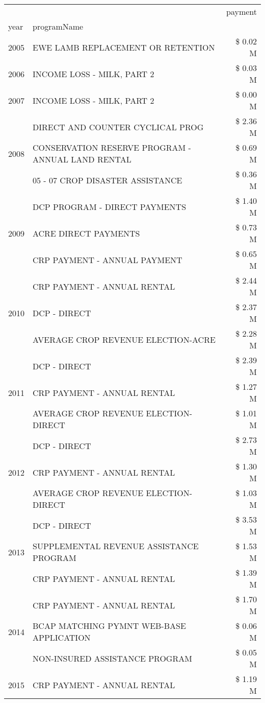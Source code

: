 \begin{tabular}{llr}
\toprule
 &  & payment \\
year & programName &  \\
\midrule
2005 & EWE LAMB REPLACEMENT OR RETENTION & \$ 0.02 M \\
\cline{1-3}
2006 & INCOME LOSS - MILK, PART 2 & \$ 0.03 M \\
\cline{1-3}
2007 & INCOME LOSS - MILK, PART 2 & \$ 0.00 M \\
\cline{1-3}
\multirow[t]{3}{*}{2008} & DIRECT AND COUNTER CYCLICAL PROG & \$ 2.36 M \\
 & CONSERVATION RESERVE PROGRAM - ANNUAL LAND RENTAL & \$ 0.69 M \\
 & 05 - 07 CROP DISASTER ASSISTANCE & \$ 0.36 M \\
\cline{1-3}
\multirow[t]{3}{*}{2009} & DCP PROGRAM - DIRECT PAYMENTS & \$ 1.40 M \\
 & ACRE DIRECT PAYMENTS & \$ 0.73 M \\
 & CRP PAYMENT - ANNUAL PAYMENT & \$ 0.65 M \\
\cline{1-3}
\multirow[t]{3}{*}{2010} & CRP PAYMENT - ANNUAL RENTAL & \$ 2.44 M \\
 & DCP - DIRECT & \$ 2.37 M \\
 & AVERAGE CROP REVENUE ELECTION-ACRE & \$ 2.28 M \\
\cline{1-3}
\multirow[t]{3}{*}{2011} & DCP - DIRECT & \$ 2.39 M \\
 & CRP PAYMENT - ANNUAL RENTAL & \$ 1.27 M \\
 & AVERAGE CROP REVENUE ELECTION-DIRECT & \$ 1.01 M \\
\cline{1-3}
\multirow[t]{3}{*}{2012} & DCP - DIRECT & \$ 2.73 M \\
 & CRP PAYMENT - ANNUAL RENTAL & \$ 1.30 M \\
 & AVERAGE CROP REVENUE ELECTION-DIRECT & \$ 1.03 M \\
\cline{1-3}
\multirow[t]{3}{*}{2013} & DCP - DIRECT & \$ 3.53 M \\
 & SUPPLEMENTAL REVENUE ASSISTANCE PROGRAM & \$ 1.53 M \\
 & CRP PAYMENT - ANNUAL RENTAL & \$ 1.39 M \\
\cline{1-3}
\multirow[t]{3}{*}{2014} & CRP PAYMENT - ANNUAL RENTAL & \$ 1.70 M \\
 & BCAP MATCHING PYMNT WEB-BASE APPLICATION & \$ 0.06 M \\
 & NON-INSURED ASSISTANCE PROGRAM & \$ 0.05 M \\
\cline{1-3}
\multirow[t]{3}{*}{2015} & CRP PAYMENT - ANNUAL RENTAL & \$ 1.19 M \\

\end{tabular}

